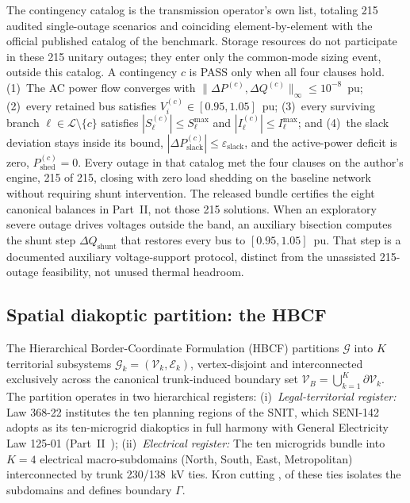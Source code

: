 The contingency catalog is the transmission operator's own list, totaling 215 audited single-outage scenarios and coinciding element-by-element with the official published catalog of the benchmark. Storage resources do not participate in these 215 unitary outages; they enter only the common-mode sizing event, outside this catalog. A contingency $c$ is PASS only when all four clauses hold.
(1)~The AC power flow converges with $\|\Delta P^{(c)}, \Delta Q^{(c)}\|_{\infty} \le 10^{-8}$~pu; (2)~every retained bus satisfies $V_i^{(c)} \in [0.95, 1.05]$~pu; (3)~every surviving branch $\ell \in \mathcal{L}\setminus\{c\}$ satisfies $|S_\ell^{(c)}| \le S_\ell^{\max}$ and $|I_\ell^{(c)}| \le I_\ell^{\max}$; and (4)~the slack deviation stays inside its bound, $|\Delta P_{\mathrm{slack}}^{(c)}| \le \varepsilon_{\mathrm{slack}}$, and the active-power deficit is zero, $P_{\mathrm{shed}}^{(c)}=0$.
Every outage in that catalog met the four clauses on the author's engine, 215 of 215, closing with zero load shedding on the baseline network without requiring shunt intervention. The released bundle certifies the eight canonical balances in Part~II, not those 215 solutions. When an exploratory severe outage drives voltages outside the band, an auxiliary bisection computes the shunt step $\Delta Q_{\mathrm{shunt}}$ that restores every bus to $[0.95, 1.05]$~pu. That step is a documented auxiliary voltage-support protocol, distinct from the unassisted 215-outage feasibility, not unused thermal headroom.


\subsection{Spatial diakoptic partition: the HBCF}
\label{sub:hbcf}

The Hierarchical Border-Coordinate Formulation (HBCF) partitions $\mathcal{G}$ into $K$ territorial subsystems $\mathcal{G}_k = (\mathcal{V}_k, \mathcal{E}_k)$, vertex-disjoint and interconnected exclusively across the canonical trunk-induced boundary set $\mathcal{V}_B = \bigcup_{k=1}^{K} \partial \mathcal{V}_k$. The partition operates in two hierarchical registers:
(i)~\emph{Legal-territorial register:} Law 368-22 \cite{ley368} institutes the ten planning regions of the SNIT, which SENI-142 adopts as its ten-microgrid diakoptics in full harmony with General Electricity Law 125-01 (Part~II~\cite{seni142part2});
(ii)~\emph{Electrical register:} The ten microgrids bundle into $K=4$ electrical macro-subdomains (North, South, East, Metropolitan) interconnected by trunk 230/138~kV ties. Kron cutting \cite{kron1963}, \cite{happ1971} of these ties isolates the subdomains and defines boundary $\Gamma$.

